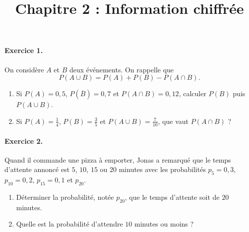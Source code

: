 \documentclass[11pt]{article}
\title{Chapitre 2 : Information chiffrée}
\date{}
\author{}
\begin{document}

\paragraph{Exercice 1.} On considère $A$ et $B$ deux événements. On rappelle que
\[
  P(A\cup B)=P(A)+P(B)-P(A\cap B).
\]
\begin{enumerate}
  \item Si $P(A)=0,5$, $P(\overline B)=0,7$ et $P(A\cap B)=0,12$, calculer
    $P(B)$ puis $P(A\cup B)$.
  \item Si $P(A)=\frac{1}{4}$, $P(B)=\frac{3}{5}$ et $P(A\cup
    B)=\frac{7}{10}$, que vaut $P(A\cap B)$ ?
\end{enumerate}

\paragraph{Exercice 2.} Quand il commande une pizza à emporter, Jonas a remarqué
que le temps d'attente annoncé est $5$, $10$, $15$ ou $20$ minutes avec les
probabilités $p_5=0,3$, $p_{10}=0,2$, $p_{15} = 0,1$ et
$p_{20}$.
\begin{enumerate}
  \item Déterminer la probabilité, notée $p_{20}$, que le temps d'attente soit de $20$ minutes.
  \item Quelle est la probabilité d'attendre $10$ minutes ou moins ?
\end{enumerate}
\end{document}
